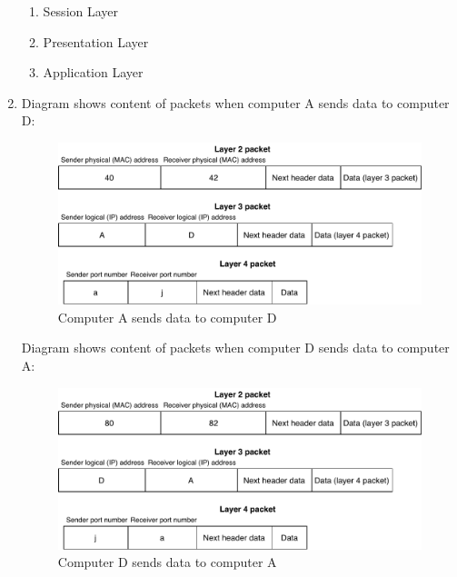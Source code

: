 \documentclass[a4paper, 11pt]{article}
\begin{document}
\begin{enumerate}
\begin{enumerate}[1]
				\item %
					Session Layer

				\item %
					Presentation Layer

				\item %
					Application Layer
			\end{enumerate}

		\item %
			Diagram shows content of packets when computer A sends data to computer D:
			\begin{figure}[H]
				\centering
				\includegraphics[width=0.7\linewidth]{inc/layer_packets_a_to_d.pdf}
				\caption{Computer A sends data to computer D}
				\label{figure:layer_packets_a_to_d}
			\end{figure}

			Diagram shows content of packets when computer D sends data to computer A:
			\begin{figure}[H]
				\centering
				\includegraphics[width=0.7\linewidth]{inc/layer_packets_d_to_a.pdf}
				\caption{Computer D sends data to computer A}
				\label{figure:layer_packets_d_to_a}
			\end{figure}


\end{enumerate}
\end{document}
